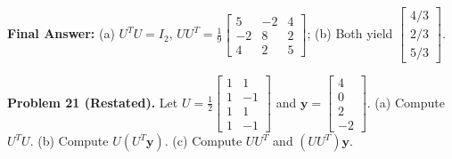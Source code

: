\documentclass[11pt, letterpaper]{article}
\theoremstyle{definition}
\theoremstyle{remark}
\begin{document}
\textbf{Final Answer:} (a) $U^T U = I_2$, $UU^T = \frac{1}{9}\begin{bmatrix} 5 & -2 & 4 \\ -2 & 8 & 2 \\ 4 & 2 & 5 \end{bmatrix}$; (b) Both yield $\begin{bmatrix} 4/3 \\ 2/3 \\ 5/3 \end{bmatrix}$.

\medskip
\textbf{Problem 21 (Restated).} Let $U = \frac{1}{2}\begin{bmatrix} 1 & 1 \\ 1 & -1 \\ 1 & 1 \\ 1 & -1 \end{bmatrix}$ and $\mathbf{y} = \begin{bmatrix} 4 \\ 0 \\ 2 \\ -2 \end{bmatrix}$. (a) Compute $U^T U$. (b) Compute $U(U^T \mathbf{y})$. (c) Compute $UU^T$ and $(UU^T)\mathbf{y}$.
\end{document}
